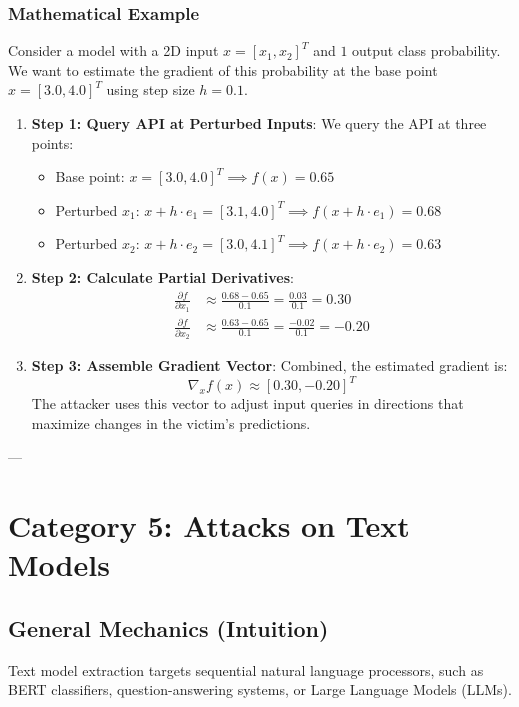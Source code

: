 \documentclass{article}
\begin{document}
\subsubsection{Mathematical Example}
Consider a model with a 2D input $x = [x_1, x_2]^T$ and $1$ output class probability. We want to estimate the gradient of this probability at the base point $x = [3.0, 4.0]^T$ using step size $h = 0.1$.
\begin{enumerate}
    \item \textbf{Step 1: Query API at Perturbed Inputs}: We query the API at three points:
    \begin{itemize}
        \item Base point: $x = [3.0, 4.0]^T \implies f(x) = 0.65$
        \item Perturbed $x_1$: $x + h \cdot e_1 = [3.1, 4.0]^T \implies f(x + h \cdot e_1) = 0.68$
        \item Perturbed $x_2$: $x + h \cdot e_2 = [3.0, 4.1]^T \implies f(x + h \cdot e_2) = 0.63$
    \end{itemize}
    
    \item \textbf{Step 2: Calculate Partial Derivatives}:
    \begin{align*}
        \frac{\partial f}{\partial x_1} &\approx \frac{0.68 - 0.65}{0.1} = \frac{0.03}{0.1} = 0.30 \\
        \frac{\partial f}{\partial x_2} &\approx \frac{0.63 - 0.65}{0.1} = \frac{-0.02}{0.1} = -0.20
    \end{align*}
    
    \item \textbf{Step 3: Assemble Gradient Vector}: Combined, the estimated gradient is:
    $$\nabla_x f(x) \approx [0.30, -0.20]^T$$
    The attacker uses this vector to adjust input queries in directions that maximize changes in the victim's predictions.
\end{enumerate}

---

\section{Category 5: Attacks on Text Models}

\subsection{General Mechanics (Intuition)}
Text model extraction targets sequential natural language processors, such as BERT classifiers, question-answering systems, or Large Language Models (LLMs).
\end{document}
